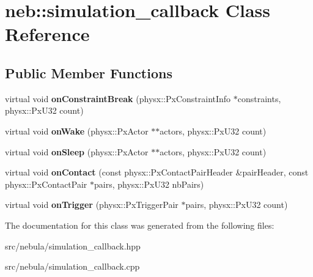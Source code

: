 \hypertarget{classneb_1_1simulation__callback}{
\section{neb::simulation\_\-callback Class Reference}
\label{classneb_1_1simulation__callback}
}
\subsection*{Public Member Functions}
\begin{DoxyCompactItemize}
\item 
\hypertarget{classneb_1_1simulation__callback_a19793cdc33472be18f7839fb2d7fea97}{
virtual void {\bfseries onConstraintBreak} (physx::PxConstraintInfo $\ast$constraints, physx::PxU32 count)}
\label{classneb_1_1simulation__callback_a19793cdc33472be18f7839fb2d7fea97}

\item 
\hypertarget{classneb_1_1simulation__callback_ae3c155b2b77603562be48c4e67fa8026}{
virtual void {\bfseries onWake} (physx::PxActor $\ast$$\ast$actors, physx::PxU32 count)}
\label{classneb_1_1simulation__callback_ae3c155b2b77603562be48c4e67fa8026}

\item 
\hypertarget{classneb_1_1simulation__callback_ab5f0852a4102fc6adf5a981803b11fc9}{
virtual void {\bfseries onSleep} (physx::PxActor $\ast$$\ast$actors, physx::PxU32 count)}
\label{classneb_1_1simulation__callback_ab5f0852a4102fc6adf5a981803b11fc9}

\item 
\hypertarget{classneb_1_1simulation__callback_a81d02ce1df83fbec396560c9f250e9a1}{
virtual void {\bfseries onContact} (const physx::PxContactPairHeader \&pairHeader, const physx::PxContactPair $\ast$pairs, physx::PxU32 nbPairs)}
\label{classneb_1_1simulation__callback_a81d02ce1df83fbec396560c9f250e9a1}

\item 
\hypertarget{classneb_1_1simulation__callback_a380b0166d2a5313df0a257960f069672}{
virtual void {\bfseries onTrigger} (physx::PxTriggerPair $\ast$pairs, physx::PxU32 count)}
\label{classneb_1_1simulation__callback_a380b0166d2a5313df0a257960f069672}

\end{DoxyCompactItemize}


The documentation for this class was generated from the following files:\begin{DoxyCompactItemize}
\item 
src/nebula/simulation\_\-callback.hpp\item 
src/nebula/simulation\_\-callback.cpp\end{DoxyCompactItemize}
